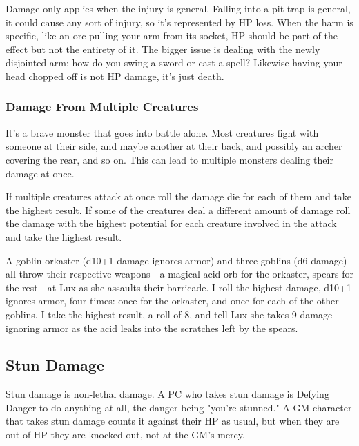        

Damage only applies when the injury is general. Falling into a pit trap is general, it could cause any sort of injury, so it's represented by HP loss. When the harm is specific, like an orc pulling your arm from its socket, HP should be part of the effect but not the entirety of it. The bigger issue is dealing with the newly disjointed arm: how do you swing a sword or cast a spell? Likewise having your head chopped off is not HP damage, it's just death.

       
\subsubsection{Damage From Multiple Creatures}     
       

It's a brave monster that goes into battle alone. Most creatures fight with someone at their side, and maybe another at their back, and possibly an archer covering the rear, and so on. This can lead to multiple monsters dealing their damage at once.

       

If multiple creatures attack at once roll the damage die for each of them and take the highest result. If some of the creatures deal a different amount of damage roll the damage with the highest potential for each creature involved in the attack and take the highest result.

       
\startExample
A goblin orkaster (d10+1 damage ignores armor) and three goblins (d6 damage) all throw their respective weapons—a magical acid orb for the orkaster, spears for the rest—at Lux as she assaults their barricade. I roll the highest damage, d10+1 ignores armor, four times: once for the orkaster, and once for each of the other goblins. I take the highest result, a roll of 8, and tell Lux she takes 9 damage ignoring armor as the acid leaks into the scratches left by the spears.
\stopExample
       
\subsection{Stun Damage}    
       

Stun damage is non-lethal damage. A PC who takes stun damage is Defying Danger to do anything at all, the danger being "you're stunned." A GM character that takes stun damage counts it against their HP as usual, but when they are out of HP they are knocked out, not at the GM's mercy.

